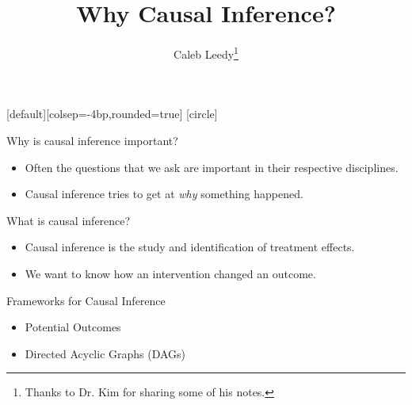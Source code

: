 \documentclass[handout]{beamer} %
\author[CL]{Caleb Leedy\footnote{Thanks to Dr. Kim for sharing some of his notes.}}
\title[Background]{Why Causal Inference?}
\begin{document}
\everymath{\displaystyle}
[default][colsep=-4bp,rounded=true]
[circle]
\frame{\titlepage}

\begin{frame}{Why is causal inference important?}

\begin{itemize}
    \item Often the questions that we ask are important in their respective disciplines.
    \item Causal inference tries to get at \textit{why} something happened.
\end{itemize}

\end{frame}

\begin{frame}{What is causal inference?}

\begin{itemize}
    \item Causal inference is the study and identification of treatment effects.
    \item We want to know how an intervention changed an outcome.
\end{itemize}

\end{frame}

%
%
%
%
%
%
%
%

\begin{frame}{Frameworks for Causal Inference}

{

\begin{itemize}
    \item<1-2> Potential Outcomes
    \item<1> Directed Acyclic Graphs (DAGs)
\end{itemize}
}

\end{frame}
\end{document}
